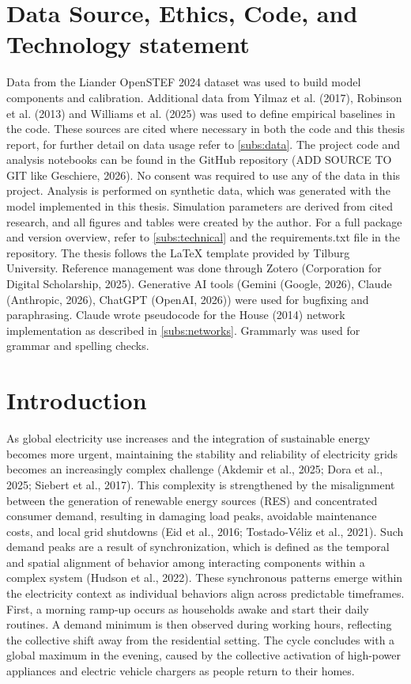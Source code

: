 \documentclass[11pt, a4paper]{article}
\begin{document}
\section{Data Source, Ethics, Code, and Technology statement}
Data from the Liander OpenSTEF 2024 dataset was used to build model components and calibration. Additional data from Yilmaz et al. (2017), Robinson et al. (2013) and Williams et al. (2025) was used to define empirical baselines in the code. These sources are cited where necessary in both the code and this thesis report, for further detail on data usage refer to \ref{subs:data}. The project code and analysis notebooks can be found  in the GitHub repository (ADD SOURCE TO GIT like Geschiere, 2026). No consent was required to use any of the data in this project. Analysis is performed on synthetic data, which was generated with the model implemented in this thesis. Simulation parameters are derived from cited research, and all figures and tables were created by the author. For a full package and version overview, refer to \ref{subs:technical} and the requirements.txt file in the repository. The thesis follows the LaTeX template provided by Tilburg University. Reference management was done through Zotero (Corporation for Digital Scholarship, 2025). Generative AI tools (Gemini (Google, 2026), Claude (Anthropic, 2026), ChatGPT (OpenAI, 2026)) were used for bugfixing and paraphrasing. Claude wrote pseudocode for the House (2014) network implementation as described in \ref{subs:networks}. Grammarly was used for grammar and spelling checks. 

\section{Introduction} \label{sec:introduction}

As global electricity use increases and the integration of sustainable energy becomes more urgent, maintaining the stability and reliability of electricity grids becomes an increasingly complex challenge (Akdemir et al., 2025; Dora et al., 2025; Siebert et al., 2017). This complexity is strengthened by the misalignment between the generation of renewable energy sources (RES) and concentrated consumer demand, resulting in damaging load peaks, avoidable maintenance costs, and local grid shutdowns (Eid et al., 2016; Tostado-Véliz et al., 2021). Such demand peaks are a result of synchronization, which is defined as the temporal and spatial alignment of behavior among interacting components within a complex system (Hudson et al., 2022). These synchronous patterns emerge within the electricity context as individual behaviors align across predictable timeframes. First, a morning ramp-up occurs as households awake and start their daily routines. A demand minimum is then observed during working hours, reflecting the collective shift away from the residential setting. The cycle concludes with a global maximum in the evening, caused by the collective activation of high-power appliances and electric vehicle chargers as people return to their homes. 
\end{document}
